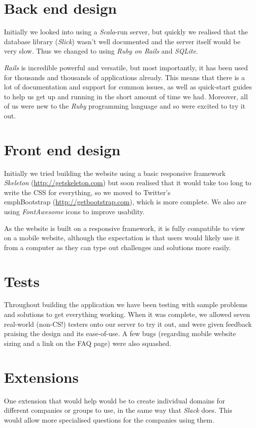 \documentclass{report}
\begin{document}
\section{Back end design}
Initially we looked into using a \emph{Scala}-run server, but quickly we realised that the database library (\emph{Slick}) wasn’t well documented and the server itself would be very slow. Thus we changed to using \emph{Ruby on Rails} and \emph{SQLite}.

\emph{Rails} is incredible powerful and versatile, but most importantly, it has been used for thousands and thousands of applications already. This means that there is a lot of documentation and support for common issues, as well as quick-start guides to help us get up and running in the short amount of time we had. Moreover, all of us were new to the \emph{Ruby} programming language and so were excited to try it out.

\section{Front end design}
Initially we tried building the website using a basic responsive framework \emph{Skeleton} (\url{http://getskeleton.com}) but soon realised that it would take too long to write the CSS for everything, so we moved to Twitter’s \\emph{Bootstrap} (\url{http://getbootstrap.com}), which is more complete. We also are using \emph{FontAwesome} icons to improve usability.

As the website is built on a responsive framework, it is fully compatible to view on a mobile website, although the expectation is that users would likely use it from a computer as they can type out challenges and solutions more easily.


\section{Tests}
Throughout building the application we have been testing with sample problems and solutions to get everything working. When it was complete, we allowed seven real-world (non-CS!) testers onto our server to try it out, and were given feedback praising the design and its ease-of-use. A few bugs (regarding mobile website sizing and a link on the FAQ page) were also squashed.

\section{Extensions}
One extension that would help would be to create individual domains for different companies or groups to use, in the same way that \emph{Slack} does. This would allow more specialised questions for the companies using them.
\end{document}
